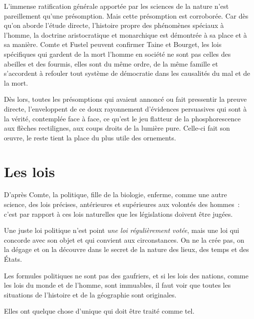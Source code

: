 \documentclass[french,twoside]{book} %
\newcommand{\astermono}{\medskip\centerline{\color{rubric}\large\selectfont{\syms ✻}}\medskip\par}%
\begin{document}
\noindent L’immense ratification générale apportée par les sciences de la nature n’est pareillement qu’une présomption. Mais cette présomption est corroborée. Car dès qu’on aborde l’étude directe, l’histoire propre des phénomènes spéciaux à l’homme, la doctrine aristocratique et monarchique est démontrée à sa place et à sa manière. Comte et Fustel peuvent confirmer Taine et Bourget, les lois spécifiques qui gardent de la mort l’homme en société ne sont pas celles des abeilles et des fourmis, elles sont du même ordre, de la même famille et s’accordent à refouler tout système de démocratie dans les causalités du mal et de la mort.\par
Dès lors, toutes les présomptions qui avaient annoncé ou fait pressentir la preuve directe, l’enveloppent de ce doux rayonnement d’évidences persuasives qui sont à la vérité, contemplée face à face, ce qu’est le jeu flatteur de la phosphorescence aux flèches rectilignes, aux coups droits de la lumière pure. Celle-ci fait son œuvre, le reste tient la place du plus utile des ornements.
\section[{Les lois}]{Les lois}
\noindent D’après Comte, la politique, fille de la biologie, enferme, comme une autre science, des lois précises, antérieures et supérieures aux volontés des hommes : c’est par rapport à ces lois naturelles que les législations doivent être jugées.\par
Une juste loi politique n’est point \emph{une loi régulièrement votée}, mais une loi qui concorde avec son objet et qui convient aux circonstances. On ne la crée pas, on la dégage et on la découvre dans le secret de la nature des lieux, des temps et des États.\par

\astermono

\noindent Les formules politiques ne sont pas des gaufriers, et si les lois des nations, comme les lois du monde et de l’homme, sont immuables, il faut voir que toutes les situations de l’histoire et de la géographie sont originales.\par
Elles ont quelque chose d’unique qui doit être traité comme tel.\par

\astermono
\end{document}
